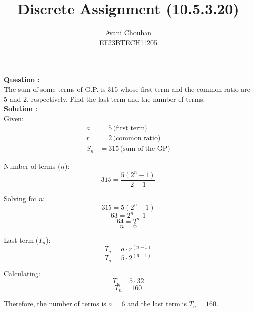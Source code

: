 \documentclass{article}
\begin{document}
\title{ Discrete Assignment (10.5.3.20)}
\author{Avani Chouhan \\
        EE23BTECH11205}
\maketitle

\textbf{Question : }\\
The sum of some terms of G.P. is 315 whose first term and the common ratio are 5 and 2, respectively. Find the last term and the number of terms.\\
\textbf{Solution : }\\
Given:
\begin{align}
a &= 5 \, \text{(first term)} \\
r &= 2 \, \text{(common ratio)} \\
S_n &= 315 \, \text{(sum of the GP)}
\end{align}

Number of terms (\(n\)):
\[315 = \frac{5(2^n - 1)}{2 - 1}\]

Solving for \(n\):
\[315 = 5(2^n - 1)\]
\[63 = 2^n - 1\]
\[64 = 2^n\]
\[n = 6\]

Last term (\(T_n\)):
\[T_n = a \cdot r^{(n-1)}\]
\[T_n = 5 \cdot 2^{(6-1)}\]

Calculating:
\[T_n = 5 \cdot 32\]\[
T_n = 160\]

Therefore, the number of terms is \(n = 6\) and the last term is \(T_n = 160\).
\end{document}

